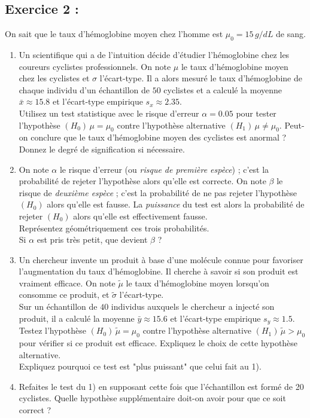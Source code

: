 \documentclass{article}
\numberwithin{equation}{section}
\begin{document}
\bigskip




\subsection*{ Exercice 2 : } 

\noindent On sait que le taux d'hémoglobine moyen chez l'homme est $\mu_0= 15\, g/dL$ de sang.

\begin{enumerate}
\item Un scientifique qui a de l'intuition décide d'étudier l'hémoglobine chez les coureurs cyclistes professionnels. 
On note $\mu$ le taux d'hémoglobine moyen chez les cyclistes et $\sigma$ l'écart-type. Il a alors mesuré le taux d'hémoglobine de chaque individu d'un échantillon de $50$ cyclistes et a calculé la moyenne $\bar{x}\approx 15.8$ et l'écart-type empirique $s_x\approx 2.35$. \\
Utilisez un test statistique avec le risque d'erreur $\alpha=0.05$ pour tester l'hypothèse $(H_0) \,\mu=\mu_0$ contre l'hypothèse alternative $(H_1)\, \mu\neq\mu_0$. Peut-on conclure que le taux d'hémoglobine moyen des cyclistes est anormal ? Donnez le degré de signification si nécessaire.

\item On note $\alpha$ le risque d'erreur (ou {\it risque de première espèce}) ;  c'est la probabilité de
rejeter l'hypothèse alors qu'elle est correcte. On note $\beta$ le risque de {\it deuxième espèce} ; c'est la probabilité de ne pas rejeter l'hypothèse $(H_0)$ alors qu'elle est fausse. La {\it puissance} du test est alors la probabilité de rejeter $(H_0)$ alors qu'elle est effectivement fausse. \\
Représentez géométriquement ces trois probabilités. \\
Si $\alpha$ est pris très petit, que devient $\beta$ ?

\item Un chercheur invente un produit à base d'une molécule connue pour favoriser l'augmentation 
du taux d'hémoglobine. Il cherche à savoir si son produit est vraiment efficace.
On note $\tilde{\mu}$ le taux
d'hémoglobine moyen lorsqu'on consomme ce produit, et $\tilde{\sigma}$ l'écart-type. \\
Sur un échantillon de $40$ individus auxquels le chercheur a injecté son produit, il a  calculé la moyenne 
$\bar{y}\approx 15.6$ et l'écart-type empirique $s_y\approx 1.5$. \\
Testez l'hypothèse $(H_0) \,\tilde{\mu}=\mu_0$ contre l'hypothèse alternative $(H_1)\, \tilde{\mu} > \mu_0$ pour vérifier si ce produit est efficace. Expliquez le choix de  cette hypothèse alternative. \\
Expliquez pourquoi ce test est "plus puissant" que celui fait au 1).

\item Refaites le test du 1) en supposant cette fois que l'échantillon est formé
de 20 cyclistes. Quelle hypothèse supplémentaire doit-on avoir pour que ce soit correct ?\\
\end{enumerate}
\end{document}
